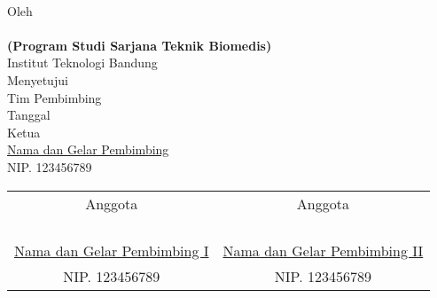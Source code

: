 \clearpage
\pagestyle{empty}

\begin{center}
    \large{\bfseries \MakeUppercase{\thetitle}}
    \\[2\baselineskip]
    
    \renewcommand{\baselinestretch}{1}
    \normalsize{Oleh\\
    	\textbf{\theauthor}\\
    	\textbf{(Program Studi Sarjana Teknik Biomedis)}
    	\\[\baselineskip]
    	Institut Teknologi Bandung}
    \\[3\baselineskip]
    
    
    \normalsize{Menyetujui\\
    	Tim Pembimbing
    	\\[\baselineskip]
    	Tanggal \thedate\\[3\baselineskip]
    	Ketua\\[4\baselineskip]
    	\underline{Nama dan Gelar Pembimbing}\\
    	NIP. 123456789}
    \\[2\baselineskip]
    
    \normalsize{%
    \setlength{\tabcolsep}{12pt}
    \begin{tabular}{c@{\hskip 0.5in}c}
        Anggota & Anggota \\
        & \\
        & \\
        & \\
        & \\
        \underline{Nama dan Gelar Pembimbing I} & \underline{Nama dan Gelar Pembimbing II} \\
        NIP. 123456789 & NIP. 123456789 \\
    \end{tabular}
    }

\end{center}
\clearpage
